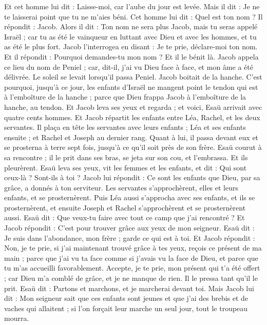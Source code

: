 \begin{multicols}{2}
Et cet homme lui dit : Laisse-moi, car l'aube du jour est levée. Mais il dit : Je ne te laisserai point que tu ne m'aies béni.
Cet homme lui dit : Quel est ton nom ? Il répondit : Jacob.
Alors il dit : Ton nom ne sera plus Jacob, mais tu seras appelé Israël ; car tu as été le vainqueur en luttant avec Dieu et avec les hommes, et tu as été le plus fort.
Jacob l’interrogea en disant : Je te prie, déclare-moi ton nom. Et il répondit : Pourquoi demandes-tu mon nom ? Et il le bénit là.
Jacob appela ce lieu du nom de Peniel ; car, dit-il, j’ai vu Dieu face à face, et mon âme a été délivrée.
Le soleil se levait lorsqu’il passa Peniel. Jacob boitait de la hanche.
C'est pourquoi, jusqu'à ce jour, les enfants d'Israël ne mangent point le tendon qui est à l’emboîture de la hanche ; parce que Dieu frappa Jacob à l'emboîture de la hanche, au tendon.
\VerseOne{}Et Jacob leva ses yeux et regarda ; et voici, Esaü arrivait avec quatre cents hommes. Et Jacob répartit les enfants entre Léa, Rachel, et les deux servantes.
Il plaça en tête les servantes avec leurs enfants ; Léa et ses enfants ensuite ; et Rachel et Joseph au dernier rang.
Quant à lui,  il passa devant eux et se prosterna à terre sept fois, jusqu'à ce qu'il soit près de son frère.
Esaü courut à sa rencontre ; il le prit dans ses bras, se jeta sur son cou, et l’embrassa. Et ils pleurèrent.
Esaü leva ses yeux, vit les femmes et les enfants, et dit : Qui sont ceux-là ? Sont-ils à toi ? Jacob lui répondit : Ce sont les enfants que Dieu, par sa grâce, a donnés à ton serviteur.
Les servantes s'approchèrent, elles et leurs enfants, et se prosternèrent.
Puis Léa aussi s'approcha avec ses enfants, et ils se prosternèrent, et ensuite Joseph et Rachel s'approchèrent et se prosternèrent aussi.
Esaü dit : Que veux-tu faire avec tout ce camp que j'ai rencontré ? Et Jacob répondit : C'est pour trouver grâce aux yeux de mon seigneur.
Esaü dit : Je suis dans l’abondance, mon frère ; garde ce qui est à toi.
Et Jacob répondit : Non, je te prie, si j'ai maintenant trouvé grâce à tes yeux, reçois ce présent de ma main ; parce que j'ai vu ta face comme si j'avais vu la face de Dieu, et parce que tu m’as accueilli favorablement.
Accepte, je te prie, mon présent qui t'a été offert ; car Dieu m’a comblé de grâce, et je ne manque de rien. Il le pressa tant qu'il le prit.
Esaü dit : Partons et marchons, et je marcherai devant toi.
Mais Jacob lui dit : Mon seigneur sait que ces enfants sont jeunes et que j’ai des brebis et de vaches qui allaitent ; si l’on forçait leur marche un seul jour, tout le troupeau mourra.

\end{multicols}
